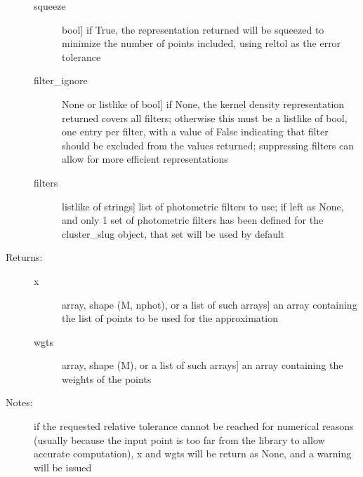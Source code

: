 \documentclass[letterpaper,10pt,english]{sphinxmanual}
\begin{document}
\begin{fulllineitems}
\begin{fulllineitems}
\begin{description}
\begin{description}
\item[{squeeze}] \leavevmode{[}bool{]}
if True, the representation returned will be squeezed to
minimize the number of points included, using reltol as
the error tolerance

\item[{filter\_ignore}] \leavevmode{[}None or listlike of bool{]}
if None, the kernel density representation returned
covers all filters; otherwise this must be a listlike of
bool, one entry per filter, with a value of False
indicating that filter should be excluded from the
values returned; suppressing filters can allow for more
efficient representations

\item[{filters}] \leavevmode{[}listlike of strings{]}
list of photometric filters to use; if left as None, and
only 1 set of photometric filters has been defined for
the cluster\_slug object, that set will be used by
default

\end{description}

\item[{Returns:}] \leavevmode\begin{description}
\item[{x}] \leavevmode{[}array, shape (M, nphot), or a list of such arrays{]}
an array containing the list of points to be used for
the approximation

\item[{wgts}] \leavevmode{[}array, shape (M), or a list of such arrays{]}
an array containing the weights of the points

\end{description}

\item[{Notes:}] \leavevmode
if the requested relative tolerance cannot be reached for
numerical reasons (usually because the input point is too
far from the library to allow accurate computation), x and
wgts will be return as None, and a warning will be issued

\end{description}

\end{fulllineitems}



\end{fulllineitems}
\end{document}
